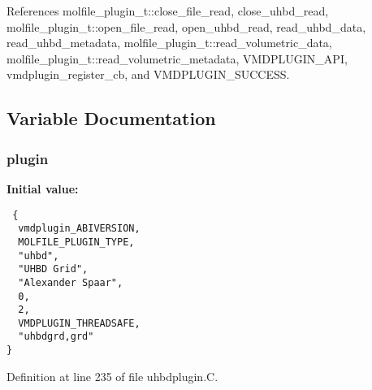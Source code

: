 References molfile\_\-plugin\_\-t::close\_\-file\_\-read, close\_\-uhbd\_\-read, molfile\_\-plugin\_\-t::open\_\-file\_\-read, open\_\-uhbd\_\-read, read\_\-uhbd\_\-data, read\_\-uhbd\_\-metadata, molfile\_\-plugin\_\-t::read\_\-volumetric\_\-data, molfile\_\-plugin\_\-t::read\_\-volumetric\_\-metadata, VMDPLUGIN\_\-API, vmdplugin\_\-register\_\-cb, and VMDPLUGIN\_\-SUCCESS.

\subsection{Variable Documentation}
\subsubsection{ plugin\hspace{0.3cm}{\tt  [static]}}\label{uhbdplugin_8C_a1}


{\bf Initial value:}

\footnotesize\begin{verbatim} {
  vmdplugin_ABIVERSION,   
  MOLFILE_PLUGIN_TYPE,    
  "uhbd",                 
  "UHBD Grid",            
  "Alexander Spaar",      
  0,                      
  2,                      
  VMDPLUGIN_THREADSAFE,   
  "uhbdgrd,grd"           
}\end{verbatim}\normalsize 


Definition at line 235 of file uhbdplugin.C.